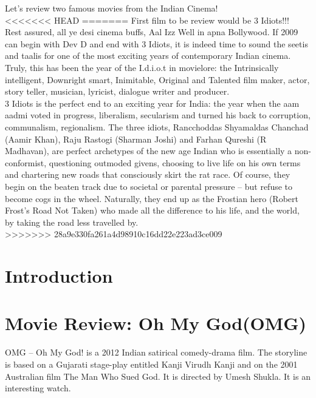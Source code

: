\documentclass{article}
\begin{document}
Let's review two famous movies from the Indian Cinema!\\
<<<<<<< HEAD
=======
First film to be  review would be 3 Idiots!!! \\
Rest assured, all ye desi cinema buffs, Aal Izz Well in apna Bollywood. If 2009 can begin with Dev D and end with 3 Idiots, it is indeed time to sound the seetis and taalis for one of the most exciting years of contemporary Indian cinema. Truly, this has been the year of the I.d.i.o.t in movielore: the Intrinsically intelligent, Downright smart, Inimitable, Original and Talented film maker, actor, story teller, musician, lyricist, dialogue writer and producer.\\

3 Idiots is the perfect end to an exciting year for India: the year when the aam aadmi voted in progress, liberalism, secularism and turned his back to corruption, communalism, regionalism. The three idiots, Rancchoddas Shyamaldas Chanchad (Aamir Khan), Raju Rastogi (Sharman Joshi) and Farhan Qureshi (R Madhavan), are perfect archetypes of the new age Indian who is essentially a non-conformist, questioning outmoded givens, choosing to live life on his own terms and chartering new roads that consciously skirt the rat race. Of course, they begin on the beaten track due to societal or parental pressure -- but refuse to become cogs in the wheel. Naturally, they end up as the Frostian hero (Robert Frost's Road Not Taken) who made all the difference to his life, and the world, by taking the road less travelled by.\\

>>>>>>> 28a9e330fa261a4d98910c16dd22e223ad3ce009

\section{Introduction}
\section{Movie Review: Oh My God(OMG)}
OMG – Oh My God! is a 2012 Indian satirical comedy-drama film. The storyline is based on a Gujarati stage-play entitled Kanji Virudh Kanji and on the 2001 Australian film The Man Who Sued God. It is directed by Umesh Shukla. It is an interesting watch.
\end{document}
